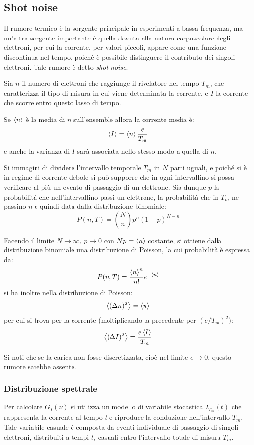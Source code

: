\subsection{Shot noise}

Il rumore termico è la sorgente principale in esperimenti a bassa frequenza, ma un'altra sorgente importante è quella dovuta alla natura corpuscolare degli elettroni, per cui la corrente, per valori piccoli, appare come una funzione discontinua nel tempo, poiché è possibile distinguere il contributo dei singoli elettroni. Tale rumore è detto \textit{shot noise}.

Sia $ n $ il numero di elettroni che raggiunge il rivelatore nel tempo $ T_m $, che caratterizza il tipo di misura in cui viene determinata la corrente, e $ I $ la corrente che scorre entro questo lasso di tempo.

Se $ \expval{n} $ è la media di $ n $ sull'ensemble allora la corrente media è:
\[ \expval{I} = \expval{n} \frac{e}{T_m} \]
e anche la varianza di $ I $ sarà associata nello stesso modo a quella di $ n $.

Si immagini di dividere l'intervallo temporale $ T_m $ in $ N $ parti uguali, e poiché si è in regime di corrente debole si può supporre che in ogni intervallino si possa verificare al più un evento di passaggio di un elettrone.
Sia dunque $ p $ la probabilità che nell'intervallino passi un elettrone, la probabilità che in $ T_m $ ne passino $ n $ è quindi data dalla distribuzione binomiale:
\[ P(n, T) = \binom{N}{n} p^n (1-p)^{N-n} \]

Facendo il limite $ N \rightarrow \infty $, $ p \rightarrow 0 $ con $ Np = \expval{n} $ costante, si ottiene dalla distribuzione binomiale una distribuzione di Poisson, la cui probabilità è espressa da:
\[ P(n,T) = \frac{\expval{n}^n}{n!} e^{-\expval{n}} \]
si ha inoltre nella distribuzione di Poisson:
\[ \expval{(\Delta n)^2} = \expval{n} \]
per cui si trova per la corrente (moltiplicando la precedente per $ (e/T_m)^2 $):
\[ \expval{(\Delta I)^2} = \frac{e\expval{I}}{T_m} \]

Si noti che se la carica non fosse discretizzata, cioè nel limite $ e \rightarrow 0 $, questo rumore sarebbe assente.

\subsubsection{Distribuzione spettrale}

Per calcolare $ G_I(\nu) $ si utilizza un modello di variabile stocastica $ I_{T_m}(t) $ che rappresenta la corrente al tempo $ t $ e riproduce la conduzione nell'intervallo $ T_m $. Tale variabile casuale è composta da eventi individuale di passaggio di singoli elettroni, distribuiti a tempi $ t_i $ casuali entro l'intervallo totale di misura $ T_m $.


